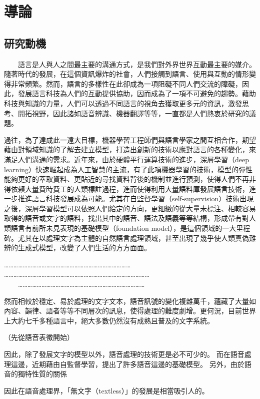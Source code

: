 \chapter{導論}
\section{研究動機}  %

　　語言是人與人之間最主要的溝通方式，是我們對外界世界互動最主要的媒介。隨著時代的發展，在這個資訊爆炸的社會，人們接觸到語言、使用與互動的情形變得非常頻繁。然而，語言的多樣性在此卻成為一項阻礙不同人們交流的障礙，因此，發展語言科技為人們的互動提供協助，因而成為了一項不可避免的趨勢。藉助科技與知識的力量，人們可以透過不同語言的視角去獲取更多元的資訊，激發思考、開拓視野，因此諸如語音辨識、機器翻譯等等，一直都是人們熱衷於研究的議題。

    過往，為了達成此一遠大目標，機器學習工程師們與語言學家之間互相合作，期望藉由對領域知識的了解去建立模型，打造出創新的技術以應對語言的各種變化，來滿足人們溝通的需求。近年來，由於硬體平行運算技術的進步，深層學習（deep learning）快速崛起成為人工智慧的主流，有了此項機器學習的技術，模型的彈性能夠更好的萃取資料、更貼近的尋找資料背後的機制並進行預測，使得人們不再非得依賴大量費時費工的人類標註過程，進而使得利用大量語料庫發展語言技術，進一步推進語言科技發展成為可能。尤其在自監督學習（self-supervision）技術出現之後，深層學習模型可以依照人們給定的方向，更細緻的從大量未標注、相較容易取得的語音或文字的語料，找出其中的語音、語法及語義等等結構，形成帶有對人類語言有前所未見表現的基礎模型（foundation model），是這個領域的一大里程碑。尤其在以處理文字為主體的自然語言處理領域，甚至出現了幾乎使人類真偽難辨的生成式模型，改變了人們生活的方方面面。

    ……………………………………………………………………… \\
    ………………………………………………………………………………… \\
　　………………………………………………………………………

    然而相較於穩定、易於處理的文字文本，語音訊號的變化複雜萬千，蘊藏了大量如內容、韻律、語者等等不同層次的訊息，使得處理的難度劇增。更何況，目前世界上大約七千多種語言中，絕大多數仍然沒有成熟且普及的文字系統。

    （先從語音表徵開始）

    因此，除了發展文字的模型以外，語音處理的技術更是必不可少的。
而在語音處理這邊，近期藉由自監督學習，提出了許多語音這邊的基礎模型。
另外，由於語音的獨特性質的關係

    因此在語音處理界，「無文字（textless）」的發展是相當吸引人的。

